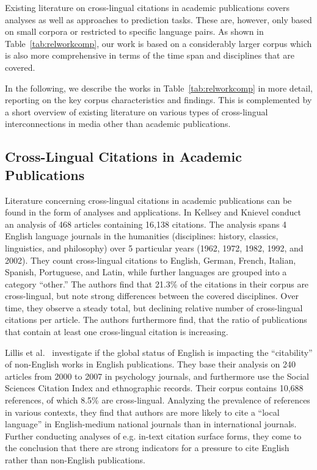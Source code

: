 Existing literature on cross-lingual citations in academic publications covers analyses as well as approaches to prediction tasks. These are, however, only based on small corpora or restricted to specific language pairs. As shown in Table~\ref{tab:relworkcomp}, our work is based on a considerably larger corpus which is also more comprehensive in terms of the time span and disciplines that are covered.

In the following, we describe the works in Table~\ref{tab:relworkcomp} in more detail, reporting on the key corpus characteristics and findings. This is complemented by a short overview of existing literature on various types of cross-lingual interconnections in media other than academic publications.


\subsection{Cross-Lingual Citations in Academic Publications}

Literature concerning cross-lingual citations in academic publications can be found in the form of analyses and applications. In \cite{Kellsey2004} Kellsey and Knievel conduct an analysis of 468 articles containing 16,138 citations. The analysis spans 4 English language journals in the humanities (disciplines: history, classics, linguistics, and philosophy) over 5 particular years (1962, 1972, 1982, 1992, and 2002). They count cross-lingual citations to English, German, French, Italian, Spanish, Portuguese, and Latin, while further languages are grouped into a category ``other.''
The authors find that 21.3\% of the citations in their corpus are cross-lingual, but note strong differences between the covered disciplines. Over time, they observe a steady total, but declining relative number of cross-lingual citations per article. The authors furthermore find, that the ratio of publications that contain at least one cross-lingual citation is increasing.

Lillis et al.~\cite{Lillis2010} investigate if the global status of English is impacting the ``citability'' of non-English works in English publications. They base their analysis on 240 articles from 2000 to 2007 in psychology journals, and furthermore use the Social Sciences Citation Index and ethnographic records. Their corpus contains 10,688 references, of which 8.5\% are cross-lingual. Analyzing the prevalence of references in various contexts, they find that authors are more likely to cite a ``local language'' in English-medium national journals than in international journals. Further conducting analyses of e.g. in-text citation surface forms, they come to the conclusion that there are strong indicators for a pressure to cite English rather than non-English publications.

